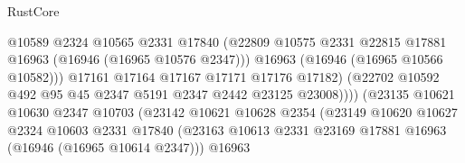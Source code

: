 \begin{lexlean}{RustCore}
\begin{coremodule}
                                          @10589
                                          @2324
                                          @10565
                                          @2331
                                          @17840
                                          (@22809
                                            @10575
                                            @2331
                                            @22815
                                            @17881
                                            @16963
                                            (@16946 (@16965 @10576 @2347)))
                                          @16963
                                          (@16946 (@16965 @10566 @10582)))
                                        @17161
                                        @17164
                                        @17167
                                        @17171
                                        @17176
                                        @17182)
                                      (@22702
                                        @10592
                                        @492
                                        @95
                                        @45
                                        @2347
                                        @5191
                                        @2347
                                        @2442
                                        @23125
                                        @23008))))
                                (@23135
                                  @10621
                                  @10630
                                  @2347
                                  @10703
                                  (@23142
                                    @10621
                                    @10628
                                    @2354
                                    (@23149
                                      @10620
                                      @10627
                                      @2324
                                      @10603
                                      @2331
                                      @17840
                                      (@23163
                                        @10613
                                        @2331
                                        @23169
                                        @17881
                                        @16963
                                        (@16946 (@16965 @10614 @2347)))
                                      @16963

\end{coremodule}
\end{lexlean}
